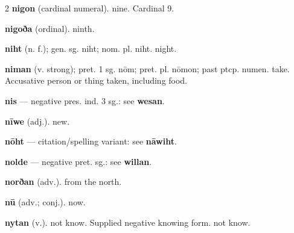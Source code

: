 \begin{multicols*}{2}
\textbf{nigon} (cardinal numeral). nine. Cardinal 9.\par
\textbf{nigoða} (ordinal). ninth.\par
\textbf{niht} (n. f.); gen. sg. niht; nom. pl. niht. night.\par
\textbf{niman} (v. strong); pret. 1 sg. nōm; pret. pl. nōmon; past ptcp. numen. take. Accusative person or thing taken, including food.\par
\textbf{nis} — negative pres. ind. 3 sg.: see \textbf{wesan}.\par
\textbf{nīwe} (adj.). new.\par
\textbf{nōht} — citation/spelling variant: see \textbf{nāwiht}.\par
\textbf{nolde} — negative pret. sg.: see \textbf{willan}.\par
\textbf{norðan} (adv.). from the north.\par
\textbf{nū} (adv.; conj.). now.\par
\textbf{nytan} (v.). not know. Supplied negative knowing form. not know.\par

\end{multicols*}
